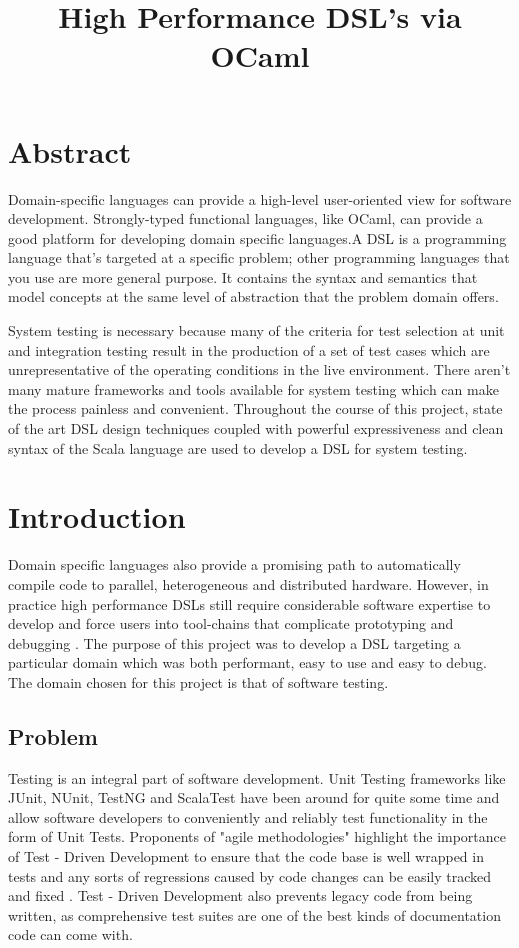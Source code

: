 \documentclass[12 pt]{article}
\title{High Performance DSL's via OCaml}
\begin{document}

\hypersetup{linkcolor=blue}
\maketitle

\tableofcontents

\newpage
\section{Abstract}
Domain-specific languages can provide a high-level user-oriented view for software development. Strongly-typed functional languages, like OCaml, can provide a good platform for developing domain specific languages.A DSL is a programming language that’s targeted at a specific problem; other programming languages that you use are more general purpose. It contains the syntax and semantics that model concepts at the same level of abstraction that the problem domain offers.
\bigskip

\noindent
System testing is necessary because many of the criteria for test selection at unit and integration testing result in the production of a set of test cases which are unrepresentative of the operating conditions in the live environment. There aren't many mature frameworks and tools available for system testing which can make the process painless and convenient. Throughout the course of this project, state of the art DSL design techniques coupled with powerful expressiveness and clean syntax of the Scala language are used to develop a DSL for system testing.

\newpage
\section{Introduction}

\noindent
Domain specific languages also provide a promising path to automatically compile code to parallel, heterogeneous and distributed hardware. However, in practice high performance DSLs still require considerable software expertise to develop and force users into tool-chains that complicate  prototyping and debugging \cite{delite}. The purpose of this project was to develop a DSL targeting a particular domain which was both performant, easy to use and easy to debug. The domain chosen for this project is that of software testing.

\subsection{Problem}
Testing is an integral part of software development. Unit Testing frameworks like JUnit, NUnit, TestNG and ScalaTest have been around for quite some time and allow software developers to conveniently and reliably test functionality in the form of Unit Tests. Proponents of "agile methodologies" highlight the importance of Test - Driven Development to ensure that the code base is well wrapped in tests and any sorts of regressions caused by code changes can be easily tracked and fixed \cite{tdd}. Test - Driven Development also prevents legacy code from being written, as comprehensive test suites are one of the best kinds of documentation code can come with.
\bigskip
\end{document}
